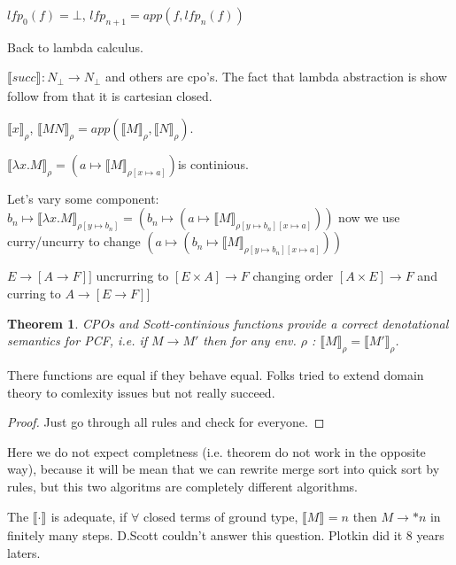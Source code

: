 \documentclass[a4paper,10pt]{book}
\newtheorem{theorem}{Theorem}
\newcommand{\sem}[2]{ \llbracket#1\rrbracket_{#2} }
\newcommand{\rarr}{ \rightarrow }
\begin{document}
 $lfp_0(f) = \bot$, $lfp_{n+1} = app(f, lfp_n(f))$
 
 
 Back to lambda calculus.
 
 $\sem{succ}{} : N_\bot \rarr N_\bot $ and others are cpo's. The fact that lambda abstraction is
 show follow from that it is cartesian closed.
 
 $\sem{x}{\rho}$, $\sem{MN}{\rho} = app(\sem{M}{\rho}, \sem{N}{\rho})$.
 
 $\sem{\lambda x.M}{\rho} = (a \mapsto \sem{M}{\rho[x \mapsto a]}) $is continious.
 
 Let's vary some component: $b_n \mapsto \sem{\lambda x.M}{\rho[y\mapsto b_n]} = 
 (b_n \mapsto (a \mapsto \sem{M}{\rho[y\mapsto b_n][x \mapsto a]})) $ now we use curry/uncurry to change 
 $(a \mapsto (b_n \mapsto \sem{M}{\rho[y\mapsto b_n][x \mapsto a]}))$
 
 $E\rarr[A\rarr F]]$ uncrurring to $[E\times A]\rarr F$ changing order $[A\times E]\rarr F$ and 
 curring  to $A\rarr[E\rarr F]]$
 
\begin{theorem}
 CPOs and Scott-continious functions provide a correct denotational semantics for PCF,
 i.e. if $M\rarr M'$ then for any env. $\rho$ : $\sem{M}{\rho} = \sem{M'}{\rho}$.
\end{theorem}
There functions are equal if they behave equal. Folks tried to extend domain theory to 
comlexity issues but not really succeed.

\begin{proof}
 Just go through all rules and check for everyone.
\end{proof}

Here we do not expect completness (i.e. theorem do not work in the opposite way), because it will 
be mean that we can rewrite merge sort into quick sort by rules, but this two algoritms are completely
different algorithms.

The $\sem{\cdot}{}$ is adequate, if $\forall$ closed terms of ground type, $\sem{M}{}=n$ then
$M \rarr* n$ in finitely many steps. D.Scott couldn't answer this question. Plotkin did it 8 years 
laters.
\end{document}
